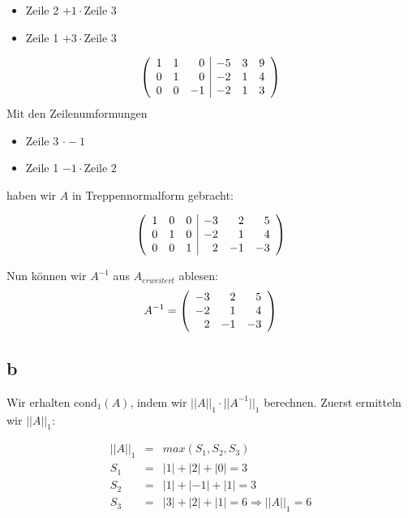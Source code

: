 \documentclass[12pt]{article}
\begin{document}
\begin{itemize}
\item Zeile 2 $ + 1 \cdot \text{Zeile } 3$
\item Zeile 1 $ + 3 \cdot \text{Zeile } 3$
\end{itemize}

$$
\left(
	\begin{array}{r r r | r r r}
		1	 &	 1	&	 0	&	-5	&	3	&	9	\\
		0	 &	 1	&	 0	&	-2	&	1 &	4	\\
		0	 &	 0	&	-1	&	-2	&	1	&	3	\\
	\end{array}
\right )
$$
Mit den Zeilenumformungen
\begin{itemize}
\item Zeile 3 $ \cdot -1$
\item Zeile 1 $ - 1 \cdot \text{Zeile } 2$
\end{itemize}
haben wir $A$ in Treppennormalform gebracht:

$$
\left(
	\begin{array}{r r r | r r r}
		1	 &	 0	&	 0	&	-3	&	 2	&	 5	\\
		0	 &	 1	&	 0	&	-2	&	 1  &	 4	\\
		0	 &	 0	&	 1	&	 2	&	-1	&	-3	\\
	\end{array}
\right )
$$

Nun können wir $A^{-1}$ aus $A_{erweitert}$ ablesen:
$$
A^{-1} = \left(
	\begin{array}{r r r}
			-3	&	 2	&	 5	\\
			-2	&	 1  &	 4	\\
		   2	&	-1	&	-3	\\
	\end{array}
\right )
$$

\subsection*{b}

Wir erhalten $\text{cond}_1(A)$, indem wir $||A||_1 \cdot ||A^{-1}||_1$ berechnen. Zuerst ermitteln wir $||A||_1$: 

\begin{eqnarray*}
||A||_1 & = & max(S_1, S_2, S_3) \\
S_1 & = & |1| + |2| + |0| =  3 \\
S_2 & = & |1|+|-1|+|1|  =  3 \\
S_3 & = & |3|+|2|+|1|  = 6 \Rightarrow  ||A||_1  =  6
\end{eqnarray*}
\end{document}
